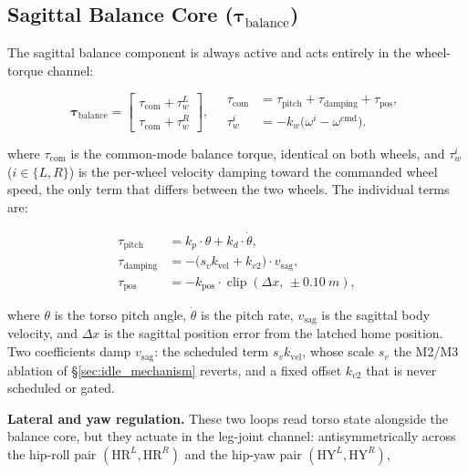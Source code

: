 \documentclass[conference]{IEEEtran}
\begin{document}
\subsection{Sagittal Balance Core ($\boldsymbol{\tau}_{\text{balance}}$)}
\label{sec:balance_core}

The sagittal balance component is always active and acts entirely in the wheel-torque channel:

\begin{equation}
\boldsymbol{\tau}_{\text{balance}} =
\begin{bmatrix}
\tau_{\text{com}} + \tau_{w}^{L} \\
\tau_{\text{com}} + \tau_{w}^{R}
\end{bmatrix},
\quad
\begin{aligned}
\tau_{\text{com}} &= \tau_{\text{pitch}} + \tau_{\text{damping}} + \tau_{\text{pos}},\\
\tau_{w}^{i} &= -k_{w}\big(\omega^{i} - \omega^{\text{cmd}}\big).
\end{aligned}
\label{eq:balance}
\end{equation}

where $\tau_{\text{com}}$ is the common-mode balance torque, identical on both wheels, and $\tau_{w}^{i}$ ($i\in\{L,R\}$) is the per-wheel velocity damping toward the commanded wheel speed, the only term that differs between the two wheels. The individual terms are:

\begin{align}
\tau_{\text{pitch}} &= k_p\cdot\theta + k_d\cdot\dot{\theta},\\
\tau_{\text{damping}} &= -\big(s_v k_{\text{vel}} + k_{v2}\big)\cdot v_{\text{sag}},\\
\tau_{\text{pos}} &= -k_{\text{pos}}\cdot\operatorname{clip}(\Delta x,\,\pm\SI{0.10}{m}),
\end{align}

where $\theta$ is the torso pitch angle, $\dot{\theta}$ is the pitch rate, $v_{\text{sag}}$ is the sagittal body velocity, and $\Delta x$ is the sagittal position error from the latched home position. Two coefficients damp $v_{\text{sag}}$: the scheduled term $s_v k_{\text{vel}}$, whose scale $s_v$ the M2/M3 ablation of \S\ref{sec:idle_mechanism} reverts, and a fixed offset $k_{v2}$ that is never scheduled or gated.

\textbf{Lateral and yaw regulation.}
These two loops read torso state alongside the balance core, but they actuate in the leg-joint channel: antisymmetrically across the hip-roll pair $(\mathrm{HR}^L,\mathrm{HR}^R)$ and the hip-yaw pair $(\mathrm{HY}^L,\mathrm{HY}^R)$,
\end{document}
